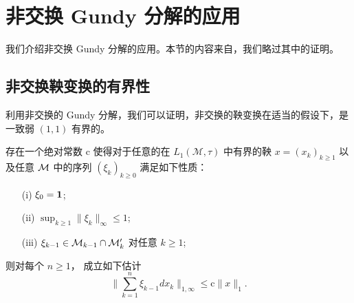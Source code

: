 \section{非交换 Gundy 分解的应用}
  我们介绍非交换 Gundy 分解的应用。本节的内容来自\cite*{parcet2006gundy}，我们略过其中的证明。

\subsection{非交换鞅变换的有界性}
    利用非交换的 Gundy 分解，我们可以证明，非交换的鞅变换在适当的假设下，是一致弱 $(1,1)$ 有界的。
\begin{theorem}
  存在一个绝对常数 $\mathrm{c}$ 使得对于任意的在 $L_1(\mathcal{M}, \tau)$ 中有界的鞅
  $x=(x_k)_{k \ge 1}$ 以及任意 $\mathcal{M}$ 中的序列 $(\xi_{k})_{k \ge 0}$ 满足如下性质：
  \begin{itemize}
  \item[(i)] $\xi_0={\bf 1}$;
  \item[(ii)] $\sup_{k\geq 1}\|\xi_{k}\|_\infty\leq 1$;
  \item[(iii)] $\xi_{k-1} \in \mathcal{M}_{k-1} \cap \mathcal{M}'_{k}$ 对任意 $k\ge
  1$;
  \end{itemize}
  则对每个 $n \ge 1$， 成立如下估计
  \begin{equation*}
  \Big\| \sum^{n}_{k=1} \xi_{k-1} dx_k \Big\|_{1,\infty} \leq
  {\mathrm{c}} \|x\|_{1}.
  \end{equation*}
\end{theorem}
